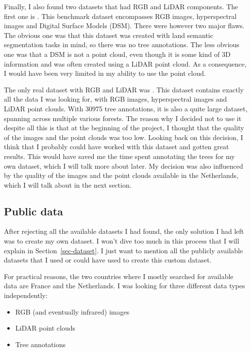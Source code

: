 \documentclass[
]{report}
\providecommand{\tightlist}{%
  \setlength{\itemsep}{0pt}\setlength{\parskip}{0pt}}\usepackage{longtable,booktabs,array}
\begin{document}
Finally, I also found two datasets that had RGB and LiDAR components.
The first one is \textcite{MDAS}. This benchmark dataset encompasses RGB
images, hyperspectral images and Digital Surface Models (DSM). There
were however two major flaws. The obvious one was that this dataset was
created with land semantic segmentation tasks in mind, so there was no
tree annotations. The less obvious one was that a DSM is not a point
cloud, even though it is some kind of 3D information and was often
created using a LiDAR point cloud. As a consequence, I would have been
very limited in my ability to use the point cloud.

The only real dataset with RGB and LiDAR was \textcite{NEON}. This
dataset contains exactly all the data I was looking for, with RGB
images, hyperspectral images and LiDAR point clouds. With 30975 tree
annotations, it is also a quite large dataset, spanning across multiple
various forests. The reason why I decided not to use it despite all this
is that at the beginning of the project, I thought that the quality of
the images and the point clouds was too low. Looking back on this
decision, I think that I probably could have worked with this dataset
and gotten great results. This would have saved me the time spent
annotating the trees for my own dataset, which I will talk more about
later. My decision was also influenced by the quality of the images and
the point clouds available in the Netherlands, which I will talk about
in the next section.

\subsection{Public data}\label{public-data}

After rejecting all the available datasets I had found, the only
solution I had left was to create my own dataset. I won't dive too much
in this process that I will explain in Section~\ref{sec-dataset}. I just
want to mention all the publicly available datasets that I used or could
have used to create this custom dataset.

For practical reasons, the two countries where I mostly searched for
available data are France and the Netherlands. I was looking for three
different data types independently:

\begin{itemize}
\tightlist
\item
  RGB (and eventually infrared) images
\item
  LiDAR point clouds
\item
  Tree annotations
\end{itemize}
\end{document}
